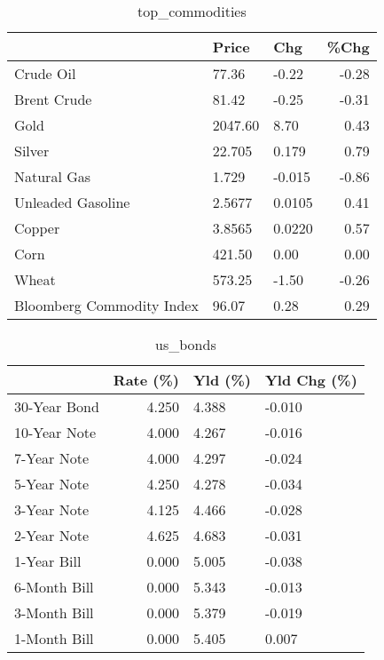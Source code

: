 \documentclass{article}%
\begin{document}
\begin{table}[htbp]%
\caption{top\_commodities}%
\centering%
\begin{adjustbox}{width=1\textwidth}%
\begin{tabular}{lllr}
\toprule
                          &   Price &    Chg &  \%Chg \\
\midrule
               Crude Oil  &   77.36 &  -0.22 & -0.28 \\
             Brent Crude  &   81.42 &  -0.25 & -0.31 \\
                    Gold  & 2047.60 &   8.70 &  0.43 \\
                  Silver  &  22.705 &  0.179 &  0.79 \\
             Natural Gas  &   1.729 & -0.015 & -0.86 \\
       Unleaded Gasoline  &  2.5677 & 0.0105 &  0.41 \\
                  Copper  &  3.8565 & 0.0220 &  0.57 \\
                    Corn  &  421.50 &   0.00 &  0.00 \\
                   Wheat  &  573.25 &  -1.50 & -0.26 \\
Bloomberg Commodity Index &   96.07 &   0.28 &  0.29 \\
\bottomrule
\end{tabular}
%
\end{adjustbox}%
\end{table}

%


\begin{table}[htbp]%
\caption{us\_bonds}%
\centering%
\begin{adjustbox}{width=1\textwidth}%
\begin{tabular}{lrll}
\toprule
             &  Rate (\%) & Yld (\%) & Yld Chg (\%) \\
\midrule
30-Year Bond &     4.250 &   4.388 &      -0.010 \\
10-Year Note &     4.000 &   4.267 &      -0.016 \\
 7-Year Note &     4.000 &   4.297 &      -0.024 \\
 5-Year Note &     4.250 &   4.278 &      -0.034 \\
 3-Year Note &     4.125 &   4.466 &      -0.028 \\
 2-Year Note &     4.625 &   4.683 &      -0.031 \\
 1-Year Bill &     0.000 &   5.005 &      -0.038 \\
6-Month Bill &     0.000 &   5.343 &      -0.013 \\
3-Month Bill &     0.000 &   5.379 &      -0.019 \\
1-Month Bill &     0.000 &   5.405 &       0.007 \\
\bottomrule
\end{tabular}
%
\end{adjustbox}%
\end{table}
\end{document}
